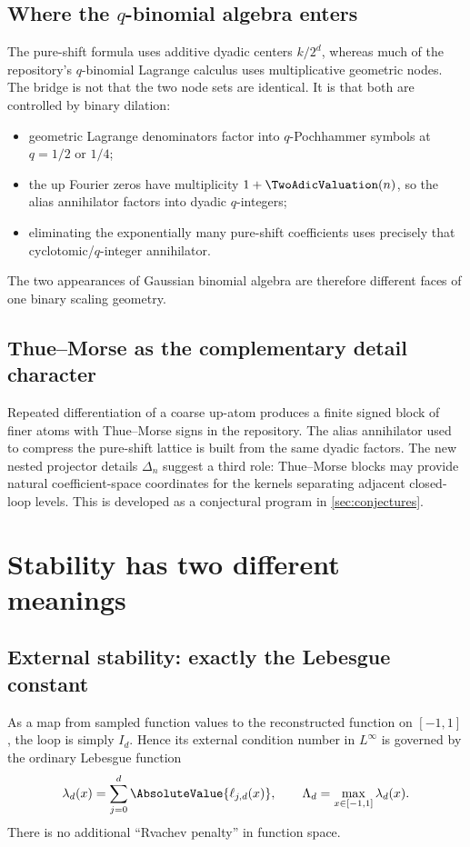 \documentclass[11pt,oneside]{article}
\numberwithin{equation}{section}
\theoremstyle{definition}
\theoremstyle{remark}
\newcommand{\Leb}{\Lambda}
\begin{document}
\subsection{Where the \(q\)-binomial algebra enters}
The pure-shift formula uses additive dyadic centers \(k/2^d\), whereas much of the
repository's \(q\)-binomial Lagrange calculus uses multiplicative geometric nodes.
The bridge is not that the two node sets are identical.  It is that both are
controlled by binary dilation:
\begin{itemize}
\item geometric Lagrange denominators factor into \(q\)-Pochhammer symbols at
      \(q=1/2\) or \(1/4\);
\item the up Fourier zeros have multiplicity \(1+\TwoAdicValuation(n)\), so the alias
      annihilator factors into dyadic \(q\)-integers;
\item eliminating the exponentially many pure-shift coefficients uses precisely
      that cyclotomic/\(q\)-integer annihilator.
\end{itemize}
The two appearances of Gaussian binomial algebra are therefore different faces of
one binary scaling geometry.

\subsection{Thue--Morse as the complementary detail character}
Repeated differentiation of a coarse up-atom produces a finite signed block of
finer atoms with Thue--Morse signs in the repository.  The alias annihilator used
to compress the pure-shift lattice is built from the same dyadic factors.  The new
nested projector details \(\Delta_n\) suggest a third role: Thue--Morse blocks may
provide natural coefficient-space coordinates for the kernels separating adjacent
closed-loop levels.  This is developed as a conjectural program in
\cref{sec:conjectures}.

\section{Stability has two different meanings}
\label{sec:stability}

\subsection{External stability: exactly the Lebesgue constant}
As a map from sampled function values to the reconstructed function on
\([-1,1]\), the loop is simply \(I_d\).  Hence its external condition number in
\(L^\infty\) is governed by the ordinary Lebesgue function
\begin{equation}
 \lambda_d(x)=\sum_{j=0}^d\AbsoluteValue{\ell_{j,d}(x)},
 \qquad
 \Leb_d=\max_{x\in[-1,1]}\lambda_d(x).
 \label{eq:lebesgue}
\end{equation}
There is no additional ``Rvachev penalty'' in function space.
\end{document}
